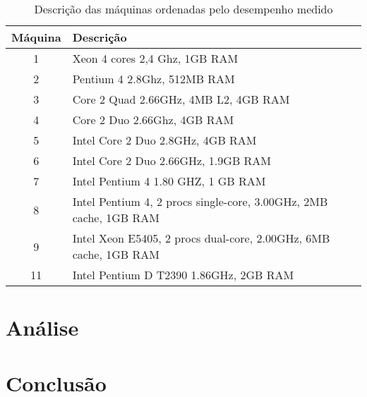 \documentclass[10pt,a4paper]{article}
\begin{document}
\begin{table}[h!]
\caption{Descrição das máquinas ordenadas pelo desempenho medido}
\begin{tabular}{cl}
\hline
Máquina & Descrição\\
\hline
1	&	  Xeon 4 cores 2,4 Ghz, 1GB RAM\\
2	&	Pentium 4 2.8Ghz, 512MB RAM\\
3	&	Core 2 Quad 2.66GHz, 4MB L2, 4GB RAM\\
4	&	Core 2 Duo 2.66Ghz, 4GB RAM\\
5	&	Intel Core 2 Duo 2.8GHz, 4GB RAM\\
6	&	Intel Core 2 Duo 2.66GHz, 1.9GB RAM\\
7	&	Intel Pentium 4 1.80 GHZ, 1 GB RAM\\
8 &	Intel Pentium 4, 2 procs single-core, 3.00GHz, 2MB cache, 1GB RAM\\
9 &	Intel Xeon E5405, 2 procs dual-core, 2.00GHz, 6MB cache, 1GB RAM\\
11 &	Intel Pentium D T2390 1.86GHz, 2GB RAM\\
\hline
\end{tabular}
\end{table}

\section{Análise}
\section{Conclusão}




\begin{small}
  
\end{small}
\end{document}
